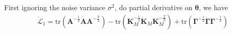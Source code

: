 \documentclass[10pt,a4paper]{article}
\begin{document}
First ignoring the noise variance $\sigma^2$, do partial derivative on $\pmb{\theta}$, we have
\begin{align}
\dot{\mathcal{L}}_1=\mathrm{tr}(\pmb{A}^{-\frac{1}{2}}\dot{\pmb{A}}\pmb{A}^{-\frac{T}{2}})-\mathrm{tr}(\pmb{K}_M^{-\frac{1}{2}}\dot{\pmb{K}}_M\pmb{K}_M^{-\frac{T}{2}})+\mathrm{tr}(\pmb{\Gamma}^{-\frac{1}{2}}\dot{\pmb{\Gamma}}\pmb{\Gamma}^{-\frac{1}{2}})
\end{align}
\end{document}
